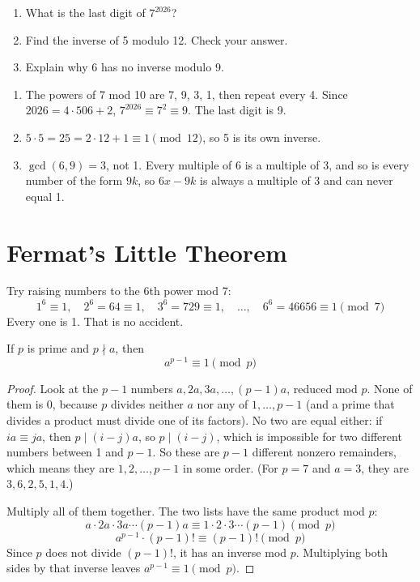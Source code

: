 \begin{Exercise}[title={Wrapping Around}, label=nt_mod]
\begin{enumerate}
\item What is the last digit of $7^{2026}$?
\item Find the inverse of 5 modulo 12. Check your answer.
\item Explain why 6 has no inverse modulo 9.
\end{enumerate}
\end{Exercise}
\begin{Answer}[ref=nt_mod]
\begin{enumerate}
\item The powers of 7 mod 10 are 7, 9, 3, 1, then repeat every 4. Since
$2026 = 4 \cdot 506 + 2$, $7^{2026} \equiv 7^2 \equiv 9$. The last digit is 9.
\item $5 \cdot 5 = 25 = 2 \cdot 12 + 1 \equiv 1 \pmod{12}$, so 5 is its own inverse.
\item $\gcd(6, 9) = 3$, not 1. Every multiple of 6 is a multiple of 3, and so is
every number of the form $9k$, so $6x - 9k$ is always a multiple of 3 and can never
equal 1.
\end{enumerate}
\end{Answer}

\section{Fermat's Little Theorem}

Try raising numbers to the 6th power mod 7:
$$1^6 \equiv 1, \quad 2^6 = 64 \equiv 1, \quad 3^6 = 729 \equiv 1, \quad \dots, \quad 6^6 = 46656 \equiv 1 \pmod{7}$$
Every one is 1. That is no accident.

\begin{theorem}
If $p$ is prime and $p \nmid a$, then
$$a^{p-1} \equiv 1 \pmod{p}$$
\end{theorem}

\begin{proof}
Look at the $p - 1$ numbers $a, 2a, 3a, \dots, (p-1)a$, reduced mod $p$. None
of them is 0, because $p$ divides neither $a$ nor any of $1, \dots, p-1$ (and a
prime that divides a product must divide one of its factors). No two are equal
either: if $ia \equiv ja$, then $p \mid (i - j)a$, so $p \mid (i - j)$, which is
impossible for two different numbers between 1 and $p - 1$. So these are $p - 1$
different nonzero remainders, which means they are $1, 2, \dots, p-1$ in some
order. (For $p = 7$ and $a = 3$, they are $3, 6, 2, 5, 1, 4$.)

Multiply all of them together. The two lists have the same product mod $p$:
$$a \cdot 2a \cdot 3a \cdots (p-1)a \equiv 1 \cdot 2 \cdot 3 \cdots (p-1) \pmod{p}$$
$$a^{p-1} \cdot (p-1)! \equiv (p-1)! \pmod{p}$$
Since $p$ does not divide $(p-1)!$, it has an inverse mod $p$. Multiplying both
sides by that inverse leaves $a^{p-1} \equiv 1 \pmod{p}$.
\end{proof}

